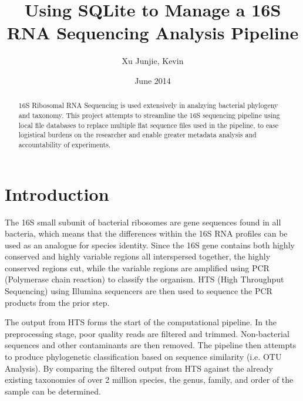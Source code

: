 \documentclass[12pt]{article}
\begin{document}
	\title{Using SQLite to Manage a 16S RNA Sequencing Analysis Pipeline}
	\author{Xu Junjie, Kevin}
	\date{June 2014}
	\maketitle
	\begin{abstract}
		16S Ribosomal RNA Sequencing is used extensively in analzying bacterial
		phylogeny and taxonomy. This project attempts to streamline the 16S sequencing
		pipeline using local file databases to replace multiple flat sequence files used
		in the pipeline, to ease logistical burdens on the researcher and enable 
		greater metadata analysis and accountability of experiments.
	\end{abstract}
	\tableofcontents
	\section{Introduction} %
	\label{sec:introduction}
	The 16S small subunit of bacterial ribosomes are gene sequences found in all bacteria, which means that the differences within the 16S RNA profiles can be used as an analogue for species identity. Since the 16S gene contains both highly conserved and highly variable regions all interspersed together,
	the highly conserved regions cut, while the variable regions are amplified using PCR (Polymerase chain reaction) to classify the organism. HTS (High Throughput Sequencing) using Illumina sequencers are then used to sequence the PCR products from the prior step.

	The output from HTS forms the start of the computational pipeline. In the preprocessing stage, poor quality reads are filtered and trimmed. 
	Non-bacterial sequences and other contaminants are then removed. 
	The pipeline then attempts to produce phylogenetic classification based on sequence similarity (i.e. OTU Analysis). By comparing the filtered output from HTS against the already existing taxonomies of over 2 million species, the genus, family, and order of the sample can be determined.


\end{document}

